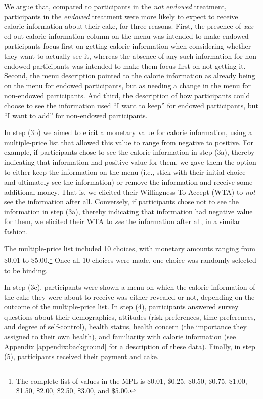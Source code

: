 We argue that, compared to participants in the \emph{not endowed} treatment, participants in the \emph{endowed} treatment were more likely to expect to receive calorie information about their cake, for three reasons. First, the presence of \emph{xxx}-ed out calorie-information column on the menu was intended to make endowed participants focus first on getting calorie information when considering whether they want to actually see it, whereas the absence of any such information for non-endowed participants was intended to make them focus first on not getting it. Second, the menu description pointed to the calorie information as already being on the menu for endowed participants, but as needing a change in the menu for non-endowed participants. And third, the description of how participants could choose to see the information used \enquote{I want to keep} for endowed participants, but \enquote{I want to add} for non-endowed participants.


In step (3b) we aimed to elicit a monetary value for calorie information, using a multiple-price list that allowed this value to range from negative to positive. For example, if participants chose to see the calorie information in step (3a), thereby indicating that information had positive value for them, we gave them the option to either keep the information on the menu (i.e., stick with their initial choice and ultimately see the information) or remove the information and receive some additional money. That is, we elicited their Willingness To Accept (WTA) to \emph{not} see the information after all. Conversely, if participants chose not to see the information in step (3a), thereby indicating that information had negative value for them, we elicited their WTA to \emph{see} the information after all, in a similar fashion.

The multiple-price list included 10 choices, with monetary amounts ranging from \$0.01 to \$5.00.\footnote{The complete list of values in the MPL is \$0.01, \$0.25, \$0.50, \$0.75, \$1.00, \$1.50, \$2.00, \$2.50, \$3.00, and \$5.00.}  Once all 10 choices were made, one choice was randomly selected to be binding.

In step (3c), participants were shown a menu on which the calorie information of the cake they were about to receive was either revealed or not, depending on the outcome of the multiple-price list. In step (4), participants answered survey questions about their demographics, attitudes (risk preferences, time preferences, and degree of self-control), health status, health concern (the importance they assigned to their own health), and familiarity with calorie information (see Appendix \ref{appendix:background} for a description of these data). Finally, in step (5), participants received their payment and cake.

